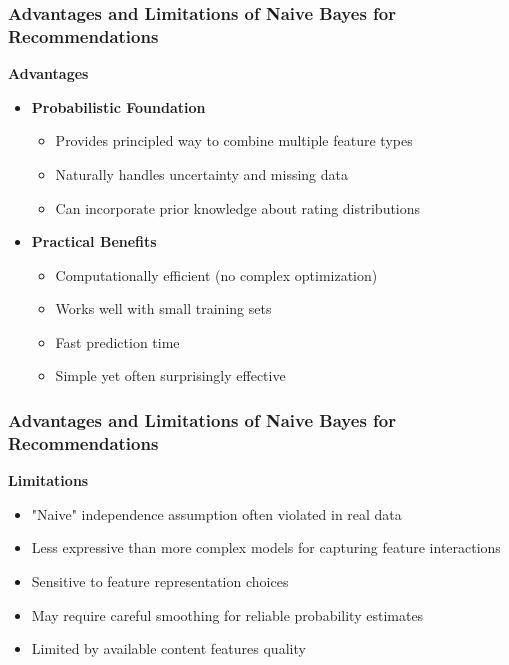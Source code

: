 \documentclass{beamer}
\begin{document}
\begin{frame}
\frametitle{Advantages and Limitations of Naive Bayes for Recommendations}

\textbf{Advantages}
\begin{itemize}
    \item \textbf{Probabilistic Foundation}
    \begin{itemize}
        \item Provides principled way to combine multiple feature types
        \item Naturally handles uncertainty and missing data
        \item Can incorporate prior knowledge about rating distributions
    \end{itemize}
    
    \item \textbf{Practical Benefits}
    \begin{itemize}
        \item Computationally efficient (no complex optimization)
        \item Works well with small training sets
        \item Fast prediction time
        \item Simple yet often surprisingly effective
    \end{itemize}
\end{itemize}
\end{frame}

\begin{frame}
\frametitle{Advantages and Limitations of Naive Bayes for Recommendations}

\textbf{Limitations}
\begin{itemize}
    \item "Naive" independence assumption often violated in real data
    \item Less expressive than more complex models for capturing feature interactions
    \item Sensitive to feature representation choices
    \item May require careful smoothing for reliable probability estimates
    \item Limited by available content features quality
\end{itemize}
\end{frame}
\end{document}
